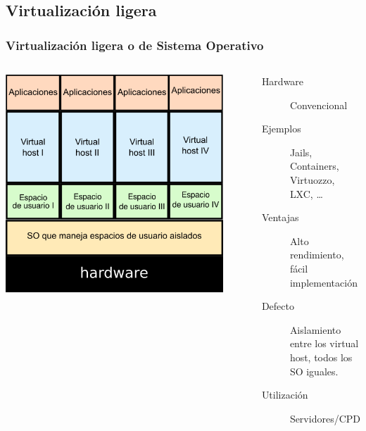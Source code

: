 \documentclass{beamer}
\begin{document}
\subsection{Virtualización ligera}
\begin{frame} \frametitle{Virtualización ligera o de Sistema Operativo}
  \begin{columns}
    \begin{center}
    \includegraphics[width=0.9\textwidth]{virt_ligera.png}      
    \end{center}
    \begin{description}
    \item[Hardware] Convencional
    \item[Ejemplos] Jails, Containers, Virtuozzo, LXC, \ldots
    \item [Ventajas] Alto rendimiento, fácil implementación
    \item[Defecto] Aislamiento entre los virtual host, todos los SO iguales.
    \item[Utilización] Servidores/CPD
    \end{description}
  \end{columns}
\end{frame}
\end{document}
